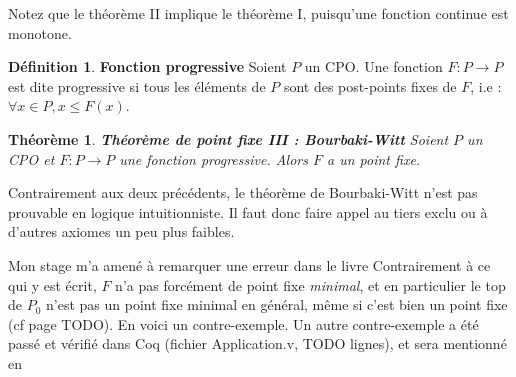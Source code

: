\documentclass{article}
\newtheorem{theorem}{Théorème}[section]
\theoremstyle{definition}
\newtheorem{definition}{Définition}[section]
\begin{document}
Notez que le théorème II implique le théorème I, puisqu'une fonction continue est monotone.

\begin{definition}{\textbf{Fonction progressive}}
Soient $P$ un CPO. Une fonction $F : P \rightarrow P$ est dite progressive si tous les éléments de $P$ sont des post-points fixes de $F$, i.e : $\forall x \in P, x \leq F(x)$.

\end{definition}

\begin{theorem}{\textbf{Théorème de point fixe III : Bourbaki-Witt}}
Soient $P$ un CPO et $F : P \rightarrow P$ une fonction progressive. Alors $F$ a un point fixe.
\end{theorem}

Contrairement aux deux précédents, le théorème de Bourbaki-Witt n'est pas prouvable en logique intuitionniste. Il faut donc faire appel au tiers exclu ou à d'autres axiomes un peu plus faibles. %

Mon stage m'a amené à remarquer une erreur dans le livre %
Contrairement à ce qui y est écrit, $F$ n'a pas forcément de point fixe \emph{minimal}, et en particulier le top de $P_0$ n'est pas un point fixe minimal en général, même si c'est bien un point fixe (cf page TODO). En voici un contre-exemple. Un autre contre-exemple a été passé et vérifié dans Coq (fichier Application.v, TODO lignes), et sera mentionné en %
\end{document}
